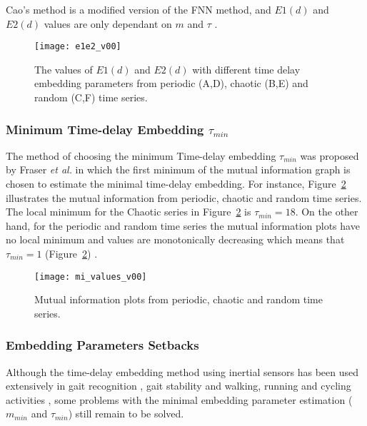 \documentclass[10pt,journal,compsoc]{IEEEtran}
\begin{document}
Cao's method is a modified version of the FNN method, and $E1(d)$ and 
$E2(d)$ values are only dependant on $m$ and $\tau$ \cite{Cao1997}.


\begin{figure}[!htb]
\centering    
 \texttt{[image: e1e2\_v00]}
\caption[PA]{The values of $E1(d)$ and $E2(d)$ with different time delay embedding parameters
from periodic (A,D), chaotic (B,E) and random (C,F) time series.}
\label{fig:e1e2}
\end{figure}


\subsubsection{Minimum Time-delay Embedding  $\tau_{min}$}
The method of choosing the minimum Time-delay embedding  $\tau_{min}$ was proposed 
by Fraser \emph{et al.} \cite{Fraser1986} in which the first minimum of the mutual 
information graph is chosen to estimate the minimal time-delay embedding.
For instance, Figure~\ref{fig:mi}  illustrates 
the mutual information from periodic, chaotic and random time series.
The local minimum for the Chaotic series in Figure~\ref{fig:mi} is $\tau_{min} = 18$.
On the other hand, for the periodic and random time series 
the mutual information plots have no local minimum 
and values are monotonically decreasing which means that $\tau_{min} = 1$ 
(Figure~\ref{fig:mi}) \cite{Fraser1986}.

\begin{figure}[!htb]
\centering    
 \texttt{[image: mi\_values\_v00]}
\caption[PA]{Mutual information plots from periodic, chaotic and random time series.}
\label{fig:mi}
\end{figure}


\subsubsection{Embedding Parameters Setbacks}
Although the time-delay embedding method using inertial sensors has been used extensively 
in gait recognition \cite{Sama2013}, gait stability \cite{Gouwanda2012} and walking, 
running and cycling activities \cite{Frank2010},
some problems with the minimal embedding parameter estimation  
($m_{min}$ and $\tau_{min}$) still remain to be solved.
\end{document}
